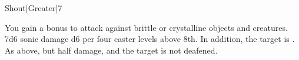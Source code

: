 \begin{spellsection}{Shout}[Greater]{7}
\begin{spellheader}
    \begin{spelltargetinginfo}
    \end{spelltargetinginfo}
\end{spellheader}
\begin{spellcontent}
    \begin{spelleffects}
        \spellspecial You gain a  bonus to attack against brittle or crystalline objects and creatures.
        \spellsuccess 7d6 sonic damage \add d6 per four caster levels above 8th. In addition, the target is \deafened.
        \spellfailure As above, but half damage, and the target is not deafened.
    \end{spelleffects}
\end{spellcontent}
\begin{spellfooter}
\end{spellfooter}
\end{spellsection}

